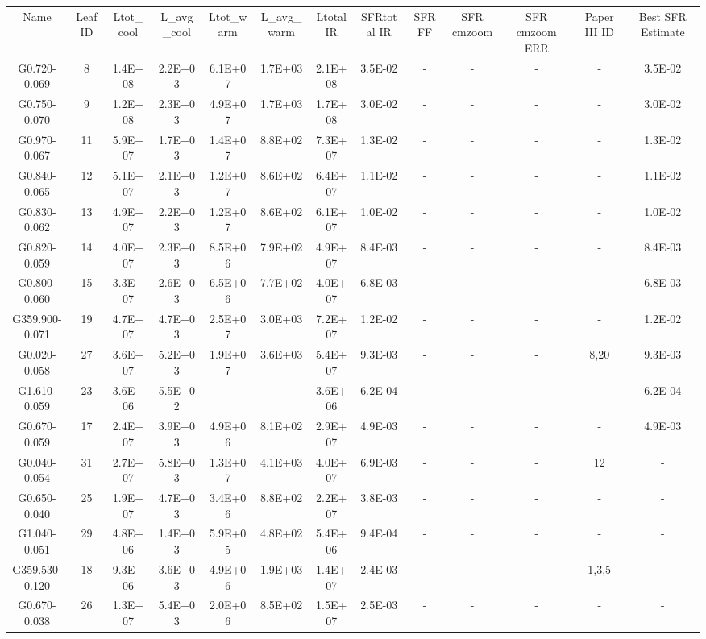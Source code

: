 \begin{table*}
\begin{tabular}{ccccccccccccc}
Name & Leaf ID & Ltot_cool & L_avg_cool & Ltot_warm & L_avg_warm & Ltotal IR & SFRtotal IR & SFR FF & SFR cmzoom & SFR cmzoom ERR & Paper III ID & Best SFR Estimate \\
G0.720-0.069 & 8 & 1.4E+08 & 2.2E+03 & 6.1E+07 & 1.7E+03 & 2.1E+08 & 3.5E-02 & - & - & - & - & 3.5E-02 \\
G0.750-0.070 & 9 & 1.2E+08 & 2.3E+03 & 4.9E+07 & 1.7E+03 & 1.7E+08 & 3.0E-02 & - & - & - & - & 3.0E-02 \\
G0.970-0.067 & 11 & 5.9E+07 & 1.7E+03 & 1.4E+07 & 8.8E+02 & 7.3E+07 & 1.3E-02 & - & - & - & - & 1.3E-02 \\
G0.840-0.065 & 12 & 5.1E+07 & 2.1E+03 & 1.2E+07 & 8.6E+02 & 6.4E+07 & 1.1E-02 & - & - & - & - & 1.1E-02 \\
G0.830-0.062 & 13 & 4.9E+07 & 2.2E+03 & 1.2E+07 & 8.6E+02 & 6.1E+07 & 1.0E-02 & - & - & - & - & 1.0E-02 \\
G0.820-0.059 & 14 & 4.0E+07 & 2.3E+03 & 8.5E+06 & 7.9E+02 & 4.9E+07 & 8.4E-03 & - & - & - & - & 8.4E-03 \\
G0.800-0.060 & 15 & 3.3E+07 & 2.6E+03 & 6.5E+06 & 7.7E+02 & 4.0E+07 & 6.8E-03 & - & - & - & - & 6.8E-03 \\
G359.900-0.071 & 19 & 4.7E+07 & 4.7E+03 & 2.5E+07 & 3.0E+03 & 7.2E+07 & 1.2E-02 & - & - & - & - & 1.2E-02 \\
G0.020-0.058 & 27 & 3.6E+07 & 5.2E+03 & 1.9E+07 & 3.6E+03 & 5.4E+07 & 9.3E-03 & - & - & - & 8,20 & 9.3E-03 \\
G1.610-0.059 & 23 & 3.6E+06 & 5.5E+02 & - & - & 3.6E+06 & 6.2E-04 & - & - & - & - & 6.2E-04 \\
G0.670-0.059 & 17 & 2.4E+07 & 3.9E+03 & 4.9E+06 & 8.1E+02 & 2.9E+07 & 4.9E-03 & - & - & - & - & 4.9E-03 \\
G0.040-0.054 & 31 & 2.7E+07 & 5.8E+03 & 1.3E+07 & 4.1E+03 & 4.0E+07 & 6.9E-03 & - & - & - & 12 & - \\
G0.650-0.040 & 25 & 1.9E+07 & 4.7E+03 & 3.4E+06 & 8.8E+02 & 2.2E+07 & 3.8E-03 & - & - & - & - & - \\
G1.040-0.051 & 29 & 4.8E+06 & 1.4E+03 & 5.9E+05 & 4.8E+02 & 5.4E+06 & 9.4E-04 & - & - & - & - & - \\
G359.530-0.120 & 18 & 9.3E+06 & 3.6E+03 & 4.9E+06 & 1.9E+03 & 1.4E+07 & 2.4E-03 & - & - & - & 1,3,5 & - \\
G0.670-0.038 & 26 & 1.3E+07 & 5.4E+03 & 2.0E+06 & 8.5E+02 & 1.5E+07 & 2.5E-03 & - & - & - & - & - \\

\end{tabular}
\end{table*}
